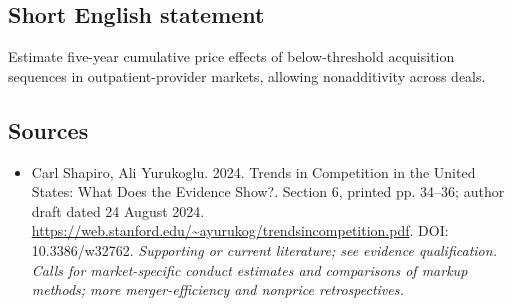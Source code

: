 \documentclass[11pt]{article}
\begin{document}
\subsection{Short English statement}
Estimate five-year cumulative price effects of below-threshold acquisition sequences in outpatient-provider markets, allowing nonadditivity across deals.

\subsection{Sources}
\begin{itemize}\raggedright
\item[\textnormal{[S1]}]\hypertarget{source:30007677:1}{} Carl Shapiro, Ali Yurukoglu. 2024. Trends in Competition in the United States: What Does the Evidence Show?. Section 6, printed pp. 34–36; author draft dated 24 August 2024.
\url{https://web.stanford.edu/~ayurukog/trendsincompetition.pdf}.
DOI: 10.3386/w32762.
{\small\textit{Supporting or current literature; see evidence qualification. Calls for market-specific conduct estimates and comparisons of markup methods; more merger-efficiency and nonprice retrospectives.}}
\end{itemize}
\end{document}

